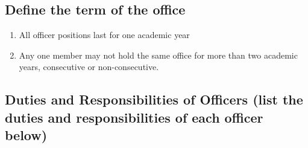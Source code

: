   \subsection{Define the term of the office}
    \begin{enumerate}[label=\arabic*.]
      \item All officer positions last for one academic year
      \item Any one member may not hold the same office for more than two
      academic years, consecutive or non-consecutive.
    \end{enumerate}
  \subsection{Duties and Responsibilities of Officers (list the duties and
  responsibilities of each officer below)}
